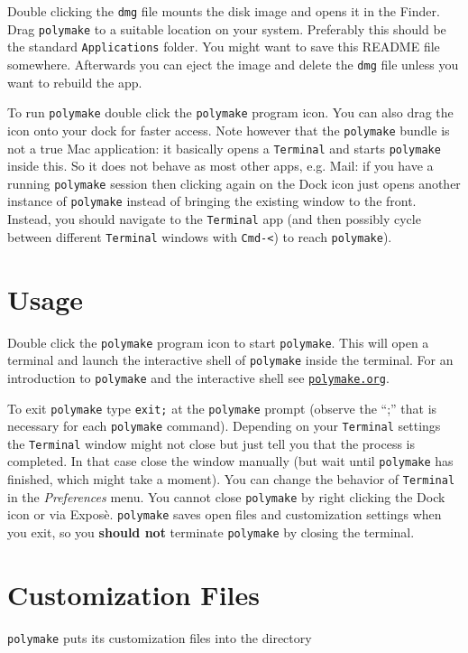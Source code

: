 \documentclass[a4paper]{amsart}
\newcommand{\polymake}{\texttt{polymake}\xspace}
\begin{document}
Double clicking the \texttt{dmg} file mounts the disk image and opens
it in the Finder. Drag \polymake to a suitable location on your
system. Preferably this should be the standard \texttt{Applications}
folder. You might want to save this README file somewhere. Afterwards
you can eject the image and delete the  \texttt{dmg} file unless you
want to rebuild the app.

To run \polymake double click the \polymake program icon. You can
also drag the icon onto your dock for faster access. Note however that
the \polymake bundle is not a true Mac application: it basically
opens a \texttt{Terminal} and starts \polymake inside this. So it does not
behave as most other apps, e.g. Mail: if you have a running \polymake
session then clicking again on the Dock icon just opens another
instance of \polymake instead of bringing the existing window to the
front. Instead, you should navigate to the \texttt{Terminal} app (and then
possibly cycle between different \texttt{Terminal} windows with \texttt{Cmd-<})
to reach \polymake).

\section*{Usage}

Double click the \polymake program icon to start \polymake. This will
open a terminal and launch the interactive shell of \polymake inside
the terminal. For an introduction to \polymake and the interactive
shell see \href{http://polymake.org}{\tt polymake.org}\;.

To exit \polymake type \texttt{exit;} at the \polymake prompt
(observe the ``;'' that is necessary for each \polymake
command). Depending on your \texttt{Terminal} settings the
\texttt{Terminal} window might not close but just tell you that the
process is completed. In that case close the window manually (but wait
until \polymake has finished, which might take a moment). You can
change the behavior of \texttt{Terminal} in the \textit{Preferences}
menu.  You cannot close \polymake by right clicking the Dock icon or
via Expos\`e. \polymake saves open files and customization settings
when you exit, so you \textbf{should not} terminate \polymake by
closing the terminal.

\section*{Customization Files}

\polymake puts its customization files into the directory 
\end{document}
